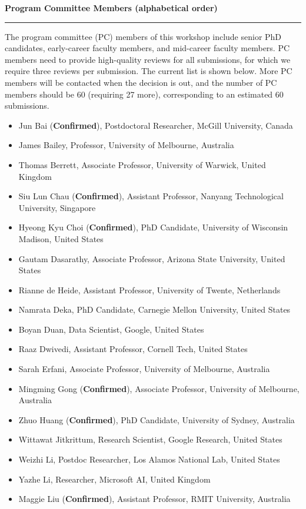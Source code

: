 \documentclass{article}
\newcommand{\confirmed}{\textcolor{green!60!black}{\textbf{Confirmed}}}
\newcommand{\sectiontitle}[1]{\noindent\textbf{\textcolor{neuripsblue}{#1}}\vspace{0.1cm}\hrule\vspace{0.2cm}}
\begin{document}
\sectiontitle{Program Committee Members (alphabetical order)}
\vspace{-2pt}
The program committee (PC) members of this workshop include senior PhD candidates, early-career faculty members, and mid-career faculty members. PC members need to provide high-quality reviews for all submissions, for which we require three reviews per submission. The current list is shown below. More PC members will be contacted when the decision is out, and the number of PC members should be 60 (requiring 27 more), corresponding to an estimated 60 submissions.
\begin{itemize}[leftmargin=10pt,nosep]
\item Jun Bai (\confirmed), Postdoctoral Researcher, McGill University, Canada
\item James Bailey, Professor, University of Melbourne, Australia
\item Thomas Berrett, Associate Professor, University of Warwick, United Kingdom
\item Siu Lun Chau (\confirmed), Assistant Professor, Nanyang Technological University, Singapore
\item Hyeong Kyu Choi (\confirmed), PhD Candidate, University of Wisconsin Madison, United States
\item Gautam Dasarathy, Associate Professor, Arizona State University, United States
\item Rianne de Heide, Assistant Professor, University of Twente, Netherlands
\item Namrata Deka, PhD Candidate, Carnegie Mellon University, United States
\item Boyan Duan, Data Scientist, Google, United States
\item Raaz Dwivedi, Assistant Professor, Cornell Tech, United States
\item Sarah Erfani, Associate Professor, University of Melbourne, Australia
\item Mingming Gong (\confirmed), Associate Professor, University of Melbourne, Australia
\item Zhuo Huang (\confirmed), PhD Candidate, University of Sydney, Australia
\item Wittawat Jitkrittum, Research Scientist, Google Research, United States
\item Weizhi Li, Postdoc Researcher, Los Alamos National Lab, United States
\item Yazhe Li, Researcher, Microsoft AI, United Kingdom
\item Maggie Liu (\confirmed), Assistant Professor, RMIT University, Australia

\end{itemize}
\end{document}
